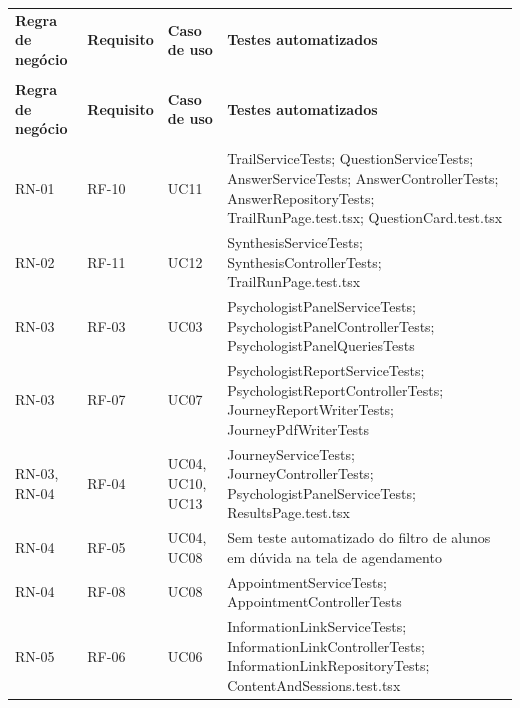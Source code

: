 \begin{apendicesenv}
{\ABNTEXfontereduzida
\renewcommand{\arraystretch}{1.25}
\begin{xltabular}{\textwidth}{|>{\centering\arraybackslash}p{1.9cm}|>{\centering\arraybackslash}p{1.5cm}|>{\centering\arraybackslash}p{2.0cm}|>{\raggedright\arraybackslash}X|}
 \\[0.3em]
\hline
\textbf{Regra de negócio} & \textbf{Requisito} & \textbf{Caso de uso} & \textbf{Testes automatizados} \\
\hline
\endfirsthead
{} \\
\hline
\textbf{Regra de negócio} & \textbf{Requisito} & \textbf{Caso de uso} & \textbf{Testes automatizados} \\
\hline
\endhead
{} \\
\endfoot
\endlastfoot
RN-01 & RF-10 & UC11 & TrailServiceTests; \allowbreak QuestionServiceTests; \allowbreak AnswerServiceTests; \allowbreak AnswerControllerTests; \allowbreak AnswerRepositoryTests; \allowbreak TrailRunPage.test.tsx; \allowbreak QuestionCard.test.tsx \\
\hline
RN-02 & RF-11 & UC12 & SynthesisServiceTests; \allowbreak SynthesisControllerTests; \allowbreak TrailRunPage.test.tsx \\
\hline
RN-03 & RF-03 & UC03 & PsychologistPanelServiceTests; \allowbreak PsychologistPanelControllerTests; \allowbreak PsychologistPanelQueriesTests \\
\hline
RN-03 & RF-07 & UC07 & PsychologistReportServiceTests; \allowbreak PsychologistReportControllerTests; \allowbreak JourneyReportWriterTests; \allowbreak JourneyPdfWriterTests \\
\hline
RN-03, RN-04 & RF-04 & UC04, UC10, UC13 & JourneyServiceTests; \allowbreak JourneyControllerTests; \allowbreak PsychologistPanelServiceTests; \allowbreak ResultsPage.test.tsx \\
\hline
RN-04 & RF-05 & UC04, UC08 & Sem teste automatizado do filtro de alunos em dúvida na tela de agendamento \\
\hline
RN-04 & RF-08 & UC08 & AppointmentServiceTests; \allowbreak AppointmentControllerTests \\
\hline
RN-05 & RF-06 & UC06 & InformationLinkServiceTests; \allowbreak InformationLinkControllerTests; \allowbreak InformationLinkRepositoryTests; \allowbreak ContentAndSessions.test.tsx \\

\end{xltabular}}
\end{apendicesenv}
